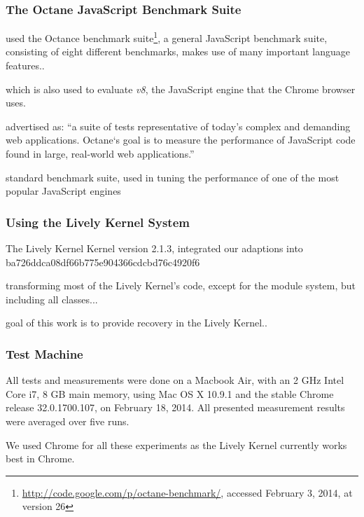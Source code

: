 
\subsubsection{The Octane JavaScript Benchmark Suite}

used the Octance benchmark suite\footnote{\url{http://code.google.com/p/octane-benchmark/}, accessed February 3, 2014, at version 26}, 
a general JavaScript benchmark suite, consisting of eight different benchmarks, makes use of many important language features..

which is also used to evaluate \emph{v8}, the JavaScript engine that the Chrome browser uses.

advertised as: ``a suite of tests representative of today’s complex and demanding web applications. Octane‘s goal is to measure the performance of JavaScript code found in large, real-world web applications.''

standard benchmark suite, used in tuning the performance of one of the most popular JavaScript engines


\subsubsection{Using the Lively Kernel System}

The Lively Kernel Kernel version 2.1.3, integrated our adaptions into ba726ddca08df66b775e904366cdcbd76c4920f6

transforming most of the Lively Kernel's code, except for the module system, but including all classes...

goal of this work is to provide recovery in the Lively Kernel..

\subsubsection{Test Machine}

All tests and measurements were done on a Macbook Air, with an 2 GHz Intel Core i7, 8 GB main memory, using Mac OS X 10.9.1 and the stable Chrome release 32.0.1700.107, on February 18, 2014.
All presented measurement results were averaged over five runs.

We used Chrome for all these experiments as the Lively Kernel currently works best in Chrome.







